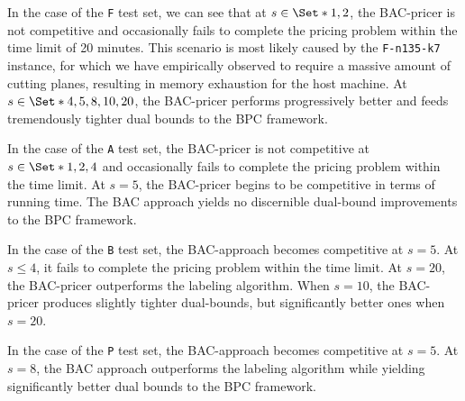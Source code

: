 In the case of the \texttt{F} test set, we can see that at $s \in \Set*{1, 2}$, the BAC-pricer is not competitive and occasionally fails to complete the pricing problem within the time limit of 20 minutes.
This scenario is most likely caused by the \texttt{F-n135-k7} instance, for which we have empirically observed to require a massive amount of cutting planes, resulting in memory exhaustion for the host machine.
At $s \in \Set*{4, 5, 8, 10, 20}$, the BAC-pricer performs progressively better and feeds tremendously tighter dual bounds to the BPC framework.

In the case of the \texttt{A} test set, the BAC-pricer is not competitive at $s \in \Set*{1, 2, 4}$ and occasionally fails to complete the pricing problem within the time limit.
At $s = 5$, the BAC-pricer begins to be competitive in terms of running time.
The BAC approach yields no discernible dual-bound improvements to the BPC framework.

In the case of the \texttt{B} test set, the BAC-approach becomes competitive at $s = 5$.
At $s \le 4$, it fails to complete the pricing problem within the time limit.
At $s = 20$, the BAC-pricer outperforms the labeling algorithm.
When $s = 10$, the BAC-pricer produces slightly tighter dual-bounds, but significantly better ones when $s = 20$.

In the case of the \texttt{P} test set, the BAC-approach becomes competitive at $s = 5$.
At $s = 8$, the BAC approach outperforms the labeling algorithm while yielding significantly better dual bounds to the BPC framework.
